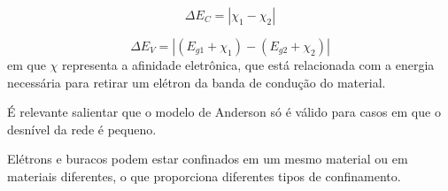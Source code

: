 	\begin{equation}
		\label{bandas_3}
		\Delta E_{C} = \left|  \chi_{1} - \chi_{2} \right|
	\end{equation}

	\begin{equation}
		\label{bandas_4}
		\Delta E_{V} = \left| \left(E_{g1} + \chi_{1}\right) - \left(E_{g2} + \chi_{2}\right) \right|
	\end{equation}
	em que $\chi$ representa a afinidade eletrônica, que está relacionada com a energia necessária para retirar um elétron da banda de condução do material. 

	\par É relevante salientar que o modelo de Anderson só é válido para casos em que o desnível da rede é pequeno. 

	\par Elétrons e buracos podem estar confinados em um mesmo material ou em materiais diferentes, o que proporciona diferentes tipos de confinamento\cite{bulk2}.


